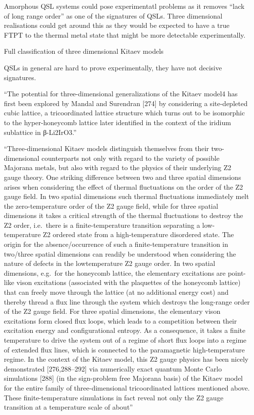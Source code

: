 Amorphous QSL systems could pose experimentatl problems as it removes ``lack of long range order'' as one of the signatures of QSLs. Three dimensional realisations could get around this as they would be expected to have a true FTPT to the thermal metal state that might be more detectable experimentally.

Full classification of three dimensional Kitaev models~\autocite{eschmannThermodynamicClassificationThreedimensional2020,OBrienPRB2016}

QSLs in general are hard to prove experimentally, they have not decisive signatures.

``The potential for three-dimensional generalizations of the Kitaev model4 has first been explored by Mandal and Surendran {[}274{]} by considering a site-depleted cubic lattice, a tricoordinated lattice structure which turns out to be isomorphic to the hyper-honeycomb lattice later identified in the context of the iridium sublattice in β-Li2IrO3.''

``Three-dimensional Kitaev models distinguish themselves from their two-dimensional counterparts not only with regard to the variety of possible Majorana metals, but also with regard to the physics of their underlying Z2 gauge theory. One striking difference between two and three spatial dimensions arises when considering the effect of thermal fluctuations on the order of the Z2 gauge field. In two spatial dimensions such thermal fluctuations immediately melt the zero-temperature order of the Z2 gauge field, while for three spatial dimensions it takes a critical strength of the thermal fluctuations to destroy the Z2 order, i.e.~there is a finite-temperature transition separating a low-temperature Z2 ordered state from a high-temperature disordered state. The origin for the absence/occurrence of such a finite-temperature transition in two/three spatial dimensions can readily be understood when considering the nature of defects in the lowtemperature Z2 gauge order. In two spatial dimensions, e.g.~for the honeycomb lattice, the elementary excitations are point-like vison excitations (associated with the plaquettes of the honeycomb lattice) that can freely move through the lattice (at no additional energy cost) and thereby thread a flux line through the system which destroys the long-range order of the Z2 gauge field. For three spatial dimensions, the elementary vison excitations form closed flux loops, which leads to a competition between their excitation energy and configurational entropy. As a consequence, it takes a finite temperature to drive the system out of a regime of short flux loops into a regime of extended flux lines, which is connected to the paramagnetic high-temperature regime. In the context of the Kitaev model, this Z2 gauge physics has been nicely demonstrated {[}276,288--292{]} via numerically exact quantum Monte Carlo simulations {[}288{]} (in the sign-problem free Majorana basis) of the Kitaev model for the entire family of three-dimensional tricoordinated lattices mentioned above. These finite-temperature simulations in fact reveal not only the Z2 gauge transition at a temperature scale of about''

